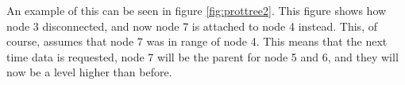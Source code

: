 An example of this can be seen in figure \ref{fig:prottree2}. This figure shows how node 3 disconnected, and now node 7 is attached to node 4 instead. This, of course, assumes that node 7 was in range of node 4.
This means that the next time data is requested, node 7 will be the parent for node 5 and 6, and they will now be a level higher than before.
